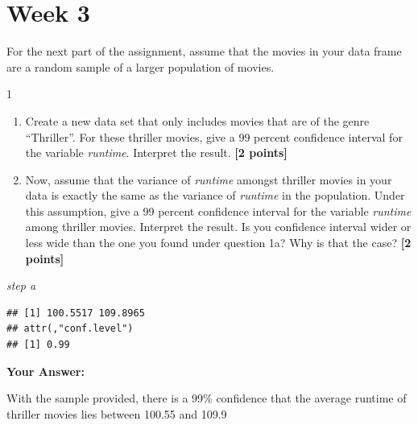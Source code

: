\documentclass[
]{article}
\newenvironment{Shaded}{\begin{snugshade}}{\end{snugshade}}
\newcommand{\AttributeTok}[1]{\textcolor[rgb]{0.13,0.29,0.53}{#1}}
\newcommand{\FloatTok}[1]{\textcolor[rgb]{0.00,0.00,0.81}{#1}}
\newcommand{\FunctionTok}[1]{\textcolor[rgb]{0.13,0.29,0.53}{\textbf{#1}}}
\newcommand{\NormalTok}[1]{#1}
\newcommand{\OtherTok}[1]{\textcolor[rgb]{0.56,0.35,0.01}{#1}}
\newcommand{\SpecialCharTok}[1]{\textcolor[rgb]{0.81,0.36,0.00}{\textbf{#1}}}
\newcommand{\StringTok}[1]{\textcolor[rgb]{0.31,0.60,0.02}{#1}}
\providecommand{\tightlist}{%
  \setlength{\itemsep}{0pt}\setlength{\parskip}{0pt}}
\begin{document}
\section{Week 3}\label{week-3}

For the next part of the assignment, assume that the movies in your data
frame are a random sample of a larger population of movies.

1

\begin{enumerate}
\def\labelenumi{\alph{enumi}.}
\tightlist
\item
  Create a new data set that only includes movies that are of the genre
  ``Thriller''. For these thriller movies, give a 99 percent confidence
  interval for the variable \emph{runtime}. Interpret the result.
  \textbf{[2 points]}
\item
  Now, assume that the variance of \emph{runtime} amongst thriller
  movies in your data is exactly the same as the variance of
  \emph{runtime} in the population. Under this assumption, give a 99
  percent confidence interval for the variable \emph{runtime} among
  thriller movies. Interpret the result. Is you confidence interval
  wider or less wide than the one you found under question 1a? Why is
  that the case? \textbf{[2 points]}
\end{enumerate}

\emph{step a}

\begin{Shaded}
\end{Shaded}

\begin{verbatim}
## [1] 100.5517 109.8965
## attr(,"conf.level")
## [1] 0.99
\end{verbatim}

\textbf{Your Answer:}

With the sample provided, there is a 99\% confidence that the average
runtime of thriller movies lies between 100.55 and 109.9
\end{document}
